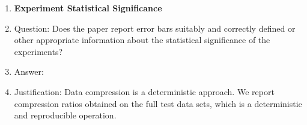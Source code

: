 \begin{enumerate}
\item {\bf Experiment Statistical Significance}
    \item[] Question: Does the paper report error bars suitably and correctly defined or other appropriate information about the statistical significance of the experiments?
    \item[] Answer: \answerNo{} %
    \item[] Justification: Data compression is a deterministic approach. We report compression ratios obtained on the full test data sets, which is a deterministic and reproducible operation. 


\end{enumerate}
